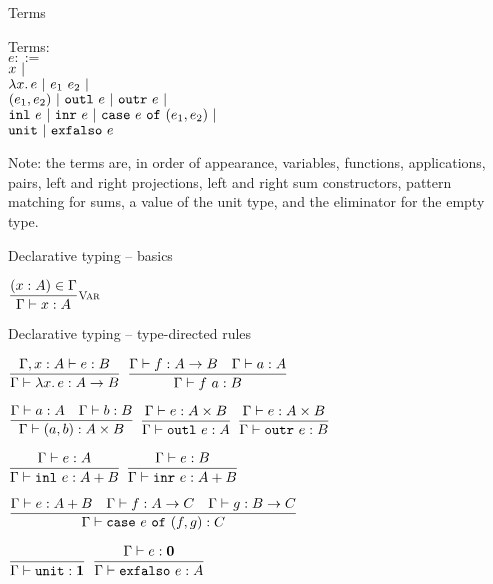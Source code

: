 \documentclass{beamer}
\begin{document}
\begin{frame}{Terms}

Terms: \\
$e ::=$ \\
\qquad $x \pipe$ \\
\qquad $\fun{x}{e} \pipe \app{e_1}{e_2} \pipe$ \\
\qquad $\pair{e_1}{e_2} \pipe \outl{e} \pipe \outr{e} \pipe$ \\
\qquad $\inl{e} \pipe \inr{e} \pipe \case{e}{e_1}{e_2} \pipe$ \\
\qquad $\unit \pipe \exfalso{e}$

\vspace{2em}

Note: the terms are, in order of appearance, variables, functions, applications, pairs, left and right projections, left and right sum constructors, pattern matching for sums, a value of the unit type, and the eliminator for the empty type.

\end{frame}

\begin{frame}{Declarative typing -- basics}

\begin{center}
  $\infrule[Var]{\sidecond{(x : A) \in \Gamma}}{\typing{x}{A}}$
\end{center}

\end{frame}

\begin{frame}{Declarative typing -- type-directed rules}

\begin{center}
  $\infrule{\fulltyping{\extend{\Gamma}{x}{A}}{e}{B}}{\typing{\fun{x}{e}}{\Fun{A}{B}}}$ \quad
  $\infrule{\typing{f}{\Fun{A}{B}} \quad \typing{a}{A}}{\typing{\app{f}{a}}{B}}$

  \vspace{2em}

  $\infrule{\typing{a}{A} \quad \typing{b}{B}}{\typing{\pair{a}{b}}{\Prod{A}{B}}}$ \quad
  $\infrule{\typing{e}{\Prod{A}{B}}}{\typing{\outl{e}}{A}}$ \quad
  $\infrule{\typing{e}{\Prod{A}{B}}}{\typing{\outr{e}}{B}}$

  \vspace{2em}

  $\infrule{\typing{e}{A}}{\typing{\inl{e}}{\Sum{A}{B}}}$ \quad
  $\infrule{\typing{e}{B}}{\typing{\inr{e}}{\Sum{A}{B}}}$

  \vspace{2em}

  $\infrule{\typing{e}{\Sum{A}{B}} \quad \typing{f}{\Fun{A}{C}} \quad \typing{g}{\Fun{B}{C}}}{\typing{\case{e}{f}{g}}{C}}$

  \vspace{2em}

  $\infrule{}{\typing{\unit}{\Unit}}$ \quad
  $\infrule{\typing{e}{\Empty}}{\typing{\exfalso{e}}{A}}$
\end{center}

\end{frame}
\end{document}
